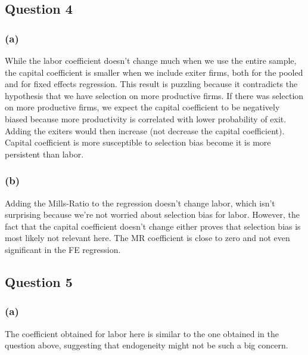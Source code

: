 \documentclass[11pt]{article}
\begin{document}
\subsection*{Question 4}
\subsubsection*{(a)}
While the labor coefficient doesn't change much when we use the entire sample, the capital coefficient is smaller when we include exiter firms, both for the pooled and for fixed effects regression. This result is puzzling because it contradicts the hypothesis that we have selection on more productive firms. If there was selection on more productive firms, we expect the capital coefficient to be negatively biased because more productivity is correlated with lower probability of exit. Adding the exiters would then increase (not decrease the capital coefficient). Capital coefficient is more susceptible to selection bias become it is more persistent than labor. 


\FloatBarrier

\subsubsection*{(b)} Adding the Mills-Ratio to the regression doesn't change labor, which isn't surprising because we're not worried about selection bias for labor. However, the fact that the capital coefficient doesn't change either proves that selection bias is most likely not relevant here. The MR coefficient is close to zero and not even significant in the FE regression. 


\FloatBarrier

\subsection*{Question 5}
\subsubsection*{(a)}
The coefficient obtained for labor here is similar to the one obtained in the question above, suggesting that endogeneity might not be such a big concern. 

\FloatBarrier
\end{document}
